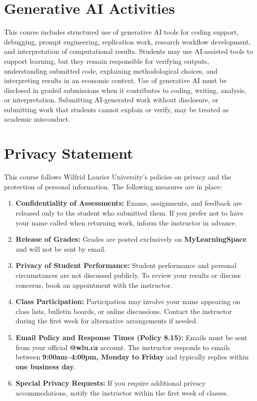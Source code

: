 \documentclass[11pt]{article}
\newcommand{\coloredsection}[1]{%
    \section*{\large\textcolor{sectioncolor}{#1}}%
}
\begin{document}
\coloredsection{Generative AI Activities}

This course includes structured use of generative AI tools for coding support, debugging, prompt engineering, replication work, research workflow development, and interpretation of computational results. Students may use AI-assisted tools to support learning, but they remain responsible for verifying outputs, understanding submitted code, explaining methodological choices, and interpreting results in an economic context. Use of generative AI must be disclosed in graded submissions when it contributes to coding, writing, analysis, or interpretation. Submitting AI-generated work without disclosure, or submitting work that students cannot explain or verify, may be treated as academic misconduct.

\coloredsection{Privacy Statement}

This course follows Wilfrid Laurier University’s policies on privacy and the protection of personal information. The following measures are in place:

\begin{enumerate}
    \item \textbf{Confidentiality of Assessments:}  
    Exams, assignments, and feedback are released only to the student who submitted them.  
    If you prefer not to have your name called when returning work, inform the instructor in advance.

    \item \textbf{Release of Grades:}  
    Grades are posted exclusively on \textbf{MyLearningSpace} and will not be sent by email.

    \item \textbf{Privacy of Student Performance:}  
    Student performance and personal circumstances are not discussed publicly.  
    To review your results or discuss concerns, book an appointment with the instructor.

    \item \textbf{Class Participation:}  
    Participation may involve your name appearing on class lists, bulletin boards,  
    or online discussions. Contact the instructor during the first week for alternative arrangements if needed.

    \item \textbf{Email Policy and Response Times (Policy 8.15):}  
Emails must be sent from your official \textbf{@wlu.ca} account.  
The instructor responds to emails between \textbf{9:00am–4:00pm, Monday to Friday}  
and typically replies within \textbf{one business day}.


    \item \textbf{Special Privacy Requests:}  
    If you require additional privacy accommodations, notify the instructor within  
    the first week of classes.
\end{enumerate}
\end{document}
